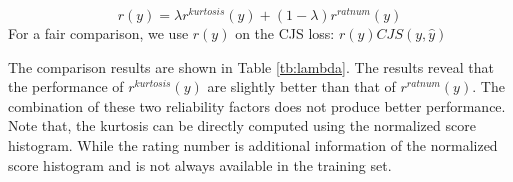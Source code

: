 \documentclass[letterpaper]{article} %
\begin{document}
\begin{equation}
r(y) = \lambda r^{kurtosis}(y) + (1-\lambda) r^{ratnum}(y)
\label{eq:lambda}
\end{equation}
For a fair comparison, we use $r(y)$ on the CJS loss: $r(y) CJS(y,\hat{y})$

The comparison results are shown in Table \ref{tb:lambda}. The results reveal that the performance of $r^{kurtosis}(y)$ are slightly better than that of $r^{ratnum}(y)$. The combination of these two reliability factors does not produce better performance. Note that, the kurtosis can be directly computed using the normalized score histogram. While the rating number is additional information of the normalized score histogram and is not always available in the training set.



\end{document}
